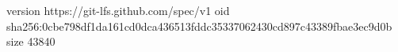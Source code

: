 version https://git-lfs.github.com/spec/v1
oid sha256:0cbe798df1da161cd0dca436513fddc35337062430cd897c43389fbae3ec9d0b
size 43840
